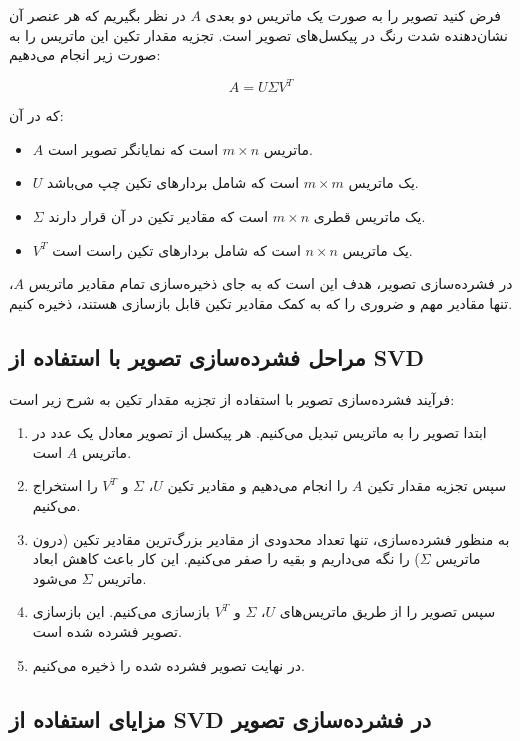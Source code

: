 فرض کنید تصویر را به صورت یک ماتریس دو بعدی \(A\) در نظر بگیریم که هر عنصر آن نشان‌دهنده شدت رنگ در پیکسل‌های تصویر است. تجزیه مقدار تکین این ماتریس را به صورت زیر انجام می‌دهیم:

\[
A = U \Sigma V^T
\]

که در آن:

\begin{itemize}
	\item \(A\) ماتریس \(m \times n\) است که نمایانگر تصویر است.
	\item \(U\) یک ماتریس \(m \times m\) است که شامل بردارهای تکین چپ می‌باشد.
	\item \(\Sigma\) یک ماتریس قطری \(m \times n\) است که مقادیر تکین در آن قرار دارند.
	\item \(V^T\) یک ماتریس \(n \times n\) است که شامل بردارهای تکین راست است.
\end{itemize}

در فشرده‌سازی تصویر، هدف این است که به جای ذخیره‌سازی تمام مقادیر ماتریس \(A\)، تنها مقادیر مهم و ضروری را که به کمک مقادیر تکین قابل بازسازی هستند، ذخیره کنیم.

\subsection{مراحل فشرده‌سازی تصویر با استفاده از SVD}

فرآیند فشرده‌سازی تصویر با استفاده از تجزیه مقدار تکین به شرح زیر است:

\begin{enumerate}
	\item ابتدا تصویر را به ماتریس تبدیل می‌کنیم. هر پیکسل از تصویر معادل یک عدد در ماتریس \(A\) است.
	\item سپس تجزیه مقدار تکین \(A\) را انجام می‌دهیم و مقادیر تکین \(U\)، \(\Sigma\) و \(V^T\) را استخراج می‌کنیم.
	\item به منظور فشرده‌سازی، تنها تعداد محدودی از مقادیر بزرگ‌ترین مقادیر تکین (درون ماتریس \(\Sigma\)) را نگه می‌داریم و بقیه را صفر می‌کنیم. این کار باعث کاهش ابعاد ماتریس \(\Sigma\) می‌شود.
	\item سپس تصویر را از طریق ماتریس‌های \(U\)، \(\Sigma\) و \(V^T\) بازسازی می‌کنیم. این بازسازی تصویر فشرده شده است.
	\item در نهایت تصویر فشرده شده را ذخیره می‌کنیم.
\end{enumerate}

\subsection{مزایای استفاده از SVD در فشرده‌سازی تصویر}

